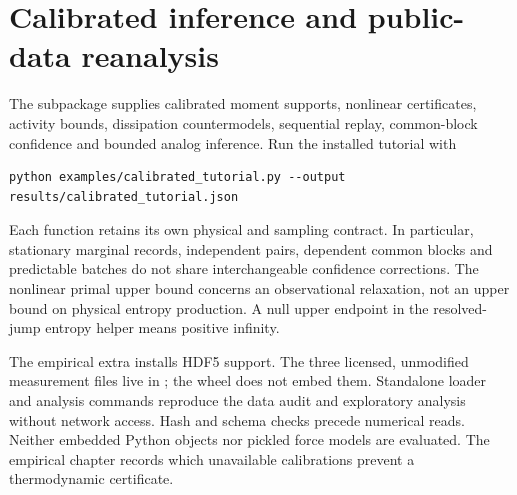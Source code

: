 \section{Calibrated inference and public-data reanalysis}
The  subpackage supplies calibrated
moment supports, nonlinear certificates, activity bounds, dissipation
countermodels, sequential replay, common-block confidence and bounded analog
inference. Run the installed tutorial with
\begin{verbatim}
python examples/calibrated_tutorial.py --output results/calibrated_tutorial.json
\end{verbatim}
Each function retains its own physical and sampling contract. In particular,
stationary marginal records, independent pairs, dependent common blocks and
predictable batches do not share interchangeable confidence corrections.
The nonlinear primal upper bound concerns an observational relaxation, not
an upper bound on physical entropy production. A null upper endpoint in the
resolved-jump entropy helper means positive infinity.

The empirical extra installs HDF5 support. The three licensed, unmodified
measurement files live in ; the wheel does
not embed them. Standalone loader and analysis commands reproduce the data
audit and exploratory analysis without network access. Hash and schema
checks precede numerical reads. Neither embedded Python objects nor pickled
force models are evaluated. The empirical chapter records which unavailable
calibrations prevent a thermodynamic certificate.
